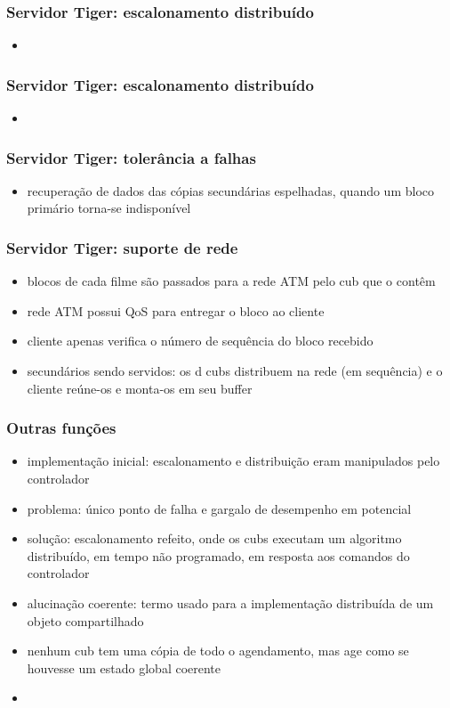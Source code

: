 \documentclass[]{beamer}
\begin{document}
\begin{frame}
 \frametitle{Servidor Tiger: escalonamento distribuído}
 \begin{itemize}
       \item 
 \end{itemize}
\end{frame}

\begin{frame}
 \frametitle{Servidor Tiger: escalonamento distribuído}
 \begin{itemize}
       \item
 \end{itemize}
\end{frame}

\begin{frame}
 \frametitle{Servidor Tiger: tolerância a falhas}
 \begin{itemize}
  \item recuperação de dados das cópias secundárias espelhadas, quando um bloco primário
torna-se indisponível
 \end{itemize}
\end{frame}

\begin{frame}
 \frametitle{Servidor Tiger: suporte de rede}
 \begin{itemize}
  \item blocos de cada filme são passados para a rede ATM pelo cub que o contêm
  \item rede ATM possui QoS para entregar  o bloco ao cliente
  \item cliente apenas verifica o número de sequência do bloco recebido
  \item secundários sendo servidos: os d cubs distribuem na rede (em sequência) e 
o cliente reúne-os e monta-os em seu buffer
 \end{itemize}
\end{frame}

\begin{frame}
 \frametitle{Outras funções}
  \begin{itemize}
   \item implementação inicial: escalonamento e distribuição eram manipulados pelo
controlador
   \item problema: único ponto de falha e gargalo de desempenho em potencial
   \item solução: escalonamento refeito, onde os cubs executam um algoritmo distribuído, 
em tempo não programado, em resposta aos comandos do controlador
   \item alucinação coerente: termo usado para a implementação distribuída de um objeto
compartilhado
   \item nenhum cub tem uma cópia de todo o agendamento, mas age como se houvesse um
estado global coerente
   \item 
  \end{itemize}

\end{frame}
\end{document}
